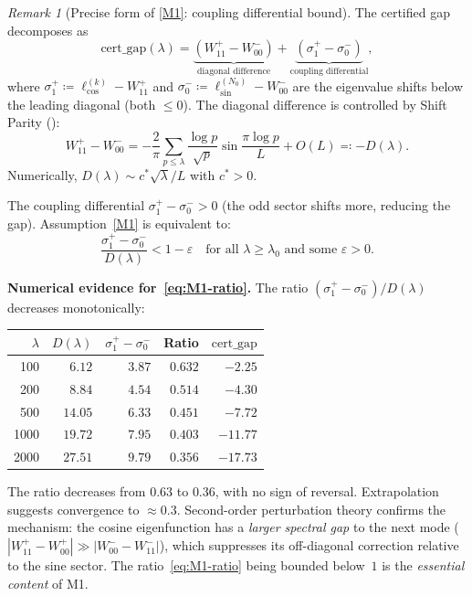 \documentclass[12pt,a4paper]{article}
\theoremstyle{definition}
\theoremstyle{remark}
\newtheorem{remark}[theorem]{Remark}
\begin{document}
\begin{remark}[Precise form of \ref{M1}: coupling differential bound]
\label{rem:M1-precise}
The certified gap decomposes as
\begin{equation}
\label{eq:gap-decomp}
  \mathrm{cert\_gap}(\lambda) = \underbrace{(W_{11}^+ - W_{00}^-)}_{\text{diagonal difference}} + \underbrace{(\sigma^+_1 - \sigma^-_0)}_{\text{coupling differential}},
\end{equation}
where $\sigma^+_1 \coloneqq \ell_{\cos}^{(k)} - W_{11}^+$ and $\sigma^-_0 \coloneqq \ell_{\sin}^{(N_0)} - W_{00}^-$ are the eigenvalue shifts below the leading diagonal (both $\leq 0$). The diagonal difference is controlled by Shift Parity ():
\[
  W_{11}^+ - W_{00}^- = -\frac{2}{\pi}\sum_{p \leq \lambda}\frac{\log p}{\sqrt{p}}\sin\frac{\pi\log p}{L} + O(L) \eqqcolon -D(\lambda).
\]
Numerically, $D(\lambda) \sim c^*\sqrt{\lambda}/L$ with $c^* > 0$.

The coupling differential $\sigma^+_1 - \sigma^-_0 > 0$ (the odd sector shifts more, reducing the gap). Assumption~\ref{M1} is equivalent to:
\begin{equation}
\label{eq:M1-ratio}
  \frac{\sigma^+_1 - \sigma^-_0}{D(\lambda)} < 1 - \varepsilon \quad\text{for all } \lambda \geq \lambda_0 \text{ and some } \varepsilon > 0.
\end{equation}
\end{remark}

\noindent\textbf{Numerical evidence for~\eqref{eq:M1-ratio}.} The ratio $(\sigma^+_1 - \sigma^-_0)/D(\lambda)$ decreases monotonically:

\begin{center}
\renewcommand{\arraystretch}{1.15}
\begin{tabular}{r|r|r|r|r}
$\lambda$ & $D(\lambda)$ & $\sigma_1^+ - \sigma_0^-$ & Ratio & $\mathrm{cert\_gap}$ \\\hline
100  & $6.12$  & $3.87$ & $0.632$ & $-2.25$ \\
200  & $8.84$  & $4.54$ & $0.514$ & $-4.30$ \\
500  & $14.05$ & $6.33$ & $0.451$ & $-7.72$ \\
1000 & $19.72$ & $7.95$ & $0.403$ & $-11.77$ \\
2000 & $27.51$ & $9.79$ & $0.356$ & $-17.73$
\end{tabular}
\end{center}

\noindent The ratio decreases from $0.63$ to $0.36$, with no sign of reversal. Extrapolation suggests convergence to $\approx 0.3$. Second-order perturbation theory confirms the mechanism: the cosine eigenfunction has a \emph{larger spectral gap} to the next mode ($|W_{11}^+ - W_{00}^+| \gg |W_{00}^- - W_{11}^-|$), which suppresses its off-diagonal correction relative to the sine sector. The ratio~\eqref{eq:M1-ratio} being bounded below~$1$ is the \emph{essential content} of M1.
\end{document}
